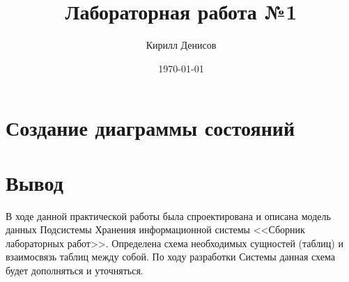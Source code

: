 \documentclass[a4paper,14pt]{extarticle}
\author{Кирилл Денисов}
\title{Лабораторная работа №1}
\date{\today}
\newcommand{\pathToCommonFolder}{/home/denilai/Documents/repos/latex/Common}
\begin{document}
	\thispagestyle{empty}
	
	\newpage
	\newpage
	
\normalsize

\section{Создание диаграммы состояний}

\section*{Вывод}

В ходе данной практической работы была спроектирована и описана модель данных Подсистемы Хранения информационной системы <<Сборник лабораторных работ>>. Определена схема необходимых сущностей (таблиц) и взаимосвязь таблиц между собой. По ходу разработки Системы данная схема будет дополняться и уточняться.
\end{document}
